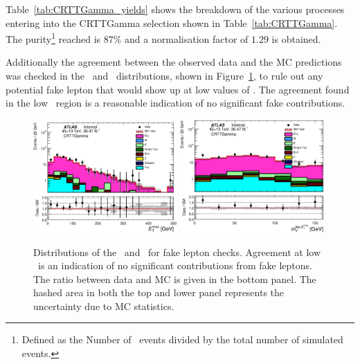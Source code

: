 		Table~\ref{tab:CRTTGamma_yields} shows the breakdown of the various processes entering into the CRTTGamma selection shown in Table~\ref{tab:CRTTGamma}. The purity\footnote{Defined as the Number of \ttgamma\ events divided by the total number of simulated events.} reached is $87\%$ and a normalisation factor of $1.29$ is obtained.

		Additionally the agreement between the observed data and the \ac{MC} predictions was checked in the \met\ and \mtlepmet\ distributions, shown in Figure~\ref{fig:fakes_check}, to rule out any potential fake lepton that would show up at low values of \mtlepmet. The agreement found in the low \mtlepmet\ region is a reasonable indication of no significant fake contributions.

		\begin{figure}[htbp]
			\begin{center}
				\includegraphics[width=0.49\textwidth]{figures/stop/ttGamma/Met_CRTTGamma_withRatio_log.eps}
				\includegraphics[width=0.49\textwidth]{figures/stop/ttGamma/MtMetLep_CRTTGamma_withRatio_log.eps}
				\caption{\label{fig:ttVFakeLepCheck} Distributions of the \met\ and \mtlepmet\ for fake lepton checks. Agreement at low \mtlepmet\ is an indication of no significant contributions from fake leptons. The ratio between data and \ac{MC} is given in the bottom panel. The hashed area in both the top and lower panel represents the uncertainty due to \ac{MC} statistics.}
				\label{fig:fakes_check}
			\end{center}
		\end{figure}

